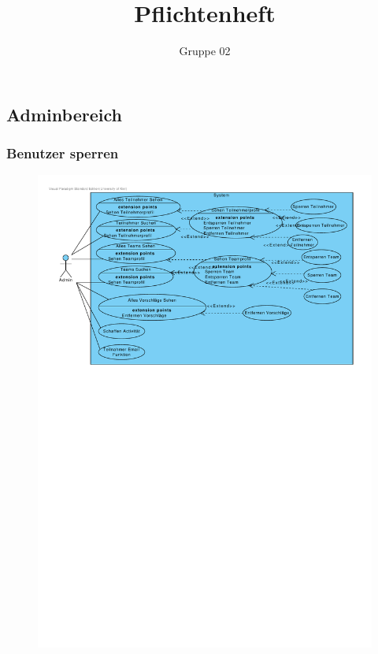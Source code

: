 \documentclass[10pt,a4paper]{article}
\author{Gruppe 02}
\title{Pflichtenheft}
\begin{document}
	\subsection{Adminbereich}
	\subsubsection{Benutzer sperren}
	\begin{figure}[h]
		\includegraphics[width=\linewidth]{gfx/webseite/adminbereich.pdf}
	\end{figure}
\end{document}
